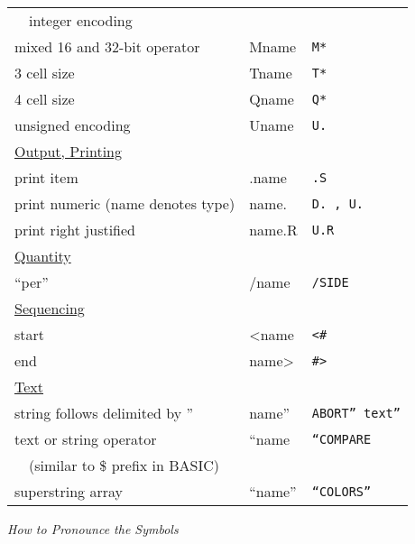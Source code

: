 \begin{longtable}{ll>{\tt}l}
~~integer encoding\\
mixed 16 and 32-bit operator&Mname&M*\\
3 cell size&Tname&T*\\
4 cell size&Qname&Q*\\
unsigned encoding&Uname&U.\\[0.5ex]
\underline{Output, Printing}\\
print item&.name&.S\\
print numeric (name denotes type)&name.&D. , U.\\
print right justified&name.R&U.R\\[0.5ex]
\underline{Quantity}\\
``per''&/name&/SIDE\\[0.5ex]
\underline{Sequencing}\\
start&<name&<\#\\
end&name>&\#>\\[0.5ex]
\underline{Text}\\
string follows delimited by ''&name''&ABORT'' text''\\
text or string operator&``name&``COMPARE\\
~~(similar to \$ prefix in BASIC)\\
superstring array&``name''&``COLORS''\\
\end{longtable}%
%

\noindent\emph{How to Pronounce the Symbols}%
\medskip

